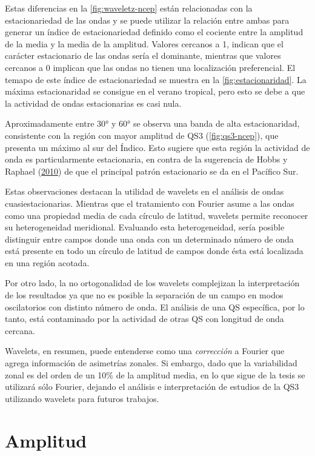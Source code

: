 \documentclass[spanish,a4paper,12pt]{book}
\begin{document}
Estas diferencias en la \autoref{fig:waveletz-ncep} están relacionadas
con la estacionariedad de las ondas y se puede utilizar la relación
entre ambas para generar un índice de estacionariedad definido como el
cociente entre la amplitud de la media y la media de la amplitud.
Valores cercanos a 1, indican que el carácter estacionario de las ondas
sería el dominante, mientras que valores cercanos a 0 implican que las
ondas no tienen una localización preferencial. El temapo de este índice
de estacionariedad se muestra en la \autoref{fig:estacionaridad}. La
máxima estacionaridad se consigue en el verano tropical, pero esto se
debe a que la actividad de ondas estacionarias es casi nula.

Aproximadamente entre 30° y 60° se observa una banda de alta
estacionaridad, consistente con la región con mayor amplitud de QS3
(\autoref{fig:qs3-ncep}), que presenta un máximo al sur del Índico. Esto
sugiere que esta región la actividad de onda es particularmente
estacionaria, en contra de la sugerencia de Hobbs y Raphael
(\protect\hyperlink{ref-Hobbs2010}{2010}) de que el principal patrón
estacionario se da en el Pacífico Sur.

Estas observaciones destacan la utilidad de wavelets en el análisis de
ondas cuasiestacionarias. Mientras que el tratamiento con Fourier asume
a las ondas como una propiedad media de cada círculo de latitud,
wavelets permite reconocer su heterogeneidad meridional. Evaluando esta
heterogeneidad, sería posible distinguir entre campos donde una onda con
un determinado número de onda está presente en todo un círculo de
latitud de campos donde ésta está localizada en una región acotada.

Por otro lado, la no ortogonalidad de los wavelets complejizan la
interpretación de los resultados ya que no es posible la separación de
un campo en modos oscilatorios con distinto número de onda. El análisis
de una QS específica, por lo tanto, está contaminado por la actividad de
otras QS con longitud de onda cercana.

Wavelets, en resumen, puede entenderse como una \emph{corrección} a
Fourier que agrega información de asimetrías zonales. Si embargo, dado
que la variabilidad zonal es del orden de un 10\% de la amplitud media,
en lo que sigue de la tesis se utilizará sólo Fourier, dejando el
análisis e interpretación de estudios de la QS3 utilizando wavelets para
futuros trabajos.

\section{Amplitud}\label{amplitud}
\end{document}
